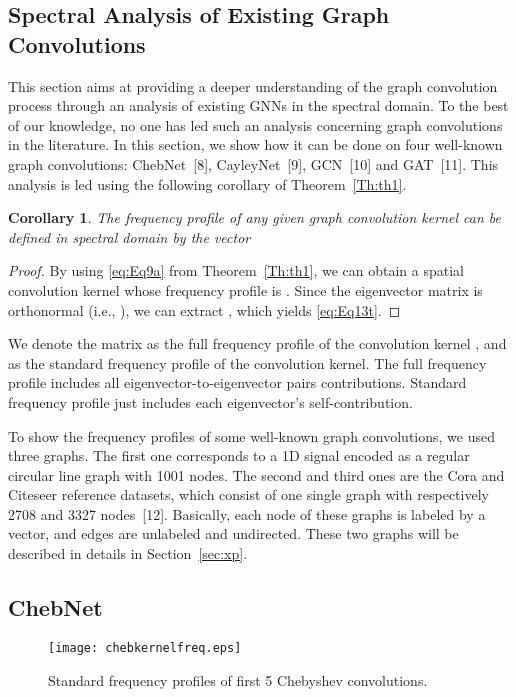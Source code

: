 \documentclass{article}
\newtheorem{corollary}{Corollary}[theorem]
\begin{document}
\subsection{Spectral Analysis of Existing Graph Convolutions}
\label{secSAGC}

This section aims at providing a deeper understanding of the graph convolution process through an analysis of existing GNNs in the spectral domain. 
To the best of our knowledge, no one has led such an analysis concerning graph convolutions in the literature. In this section, we show how it can be done on four well-known graph convolutions: ChebNet~[8], CayleyNet~[9], GCN~[10] and GAT~[11]. This analysis is led using the following corollary of Theorem~\ref{Th:th1}. 

\begin{corollary}
\label{cor:frequency_profile}
The frequency profile of any given graph convolution kernel  can be defined in spectral domain by the vector 
\end{corollary}
\begin{proof}
By using \eqref{eq:Eq9a} from Theorem~\ref{Th:th1}, we can obtain a spatial convolution kernel  whose frequency profile is . Since the eigenvector matrix is orthonormal (i.e., ), we can extract , which yields \eqref{eq:Eq13t}.\end{proof}

We denote the matrix  as the full frequency profile of the convolution kernel , and  as the standard frequency profile of the convolution kernel. The full frequency profile includes all eigenvector-to-eigenvector pairs contributions. Standard frequency profile just includes each eigenvector's self-contribution. 

To show the frequency profiles of some well-known graph convolutions, we used three graphs. The first one corresponds to a 1D signal encoded as a regular circular line graph with 1001 nodes. The second and third ones are the Cora and Citeseer reference datasets, which consist of one single graph with respectively 2708 and 3327 nodes~[12]. Basically, each node of these graphs is labeled by a vector, and edges are unlabeled and undirected. These two graphs will be described in details in Section~\ref{sec:xp}.

\subsection*{ChebNet}

\begin{figure}
\centering
\texttt{[image: chebkernelfreq.eps]}
\medskip
\caption{Standard frequency profiles of first 5 Chebyshev convolutions.
}
\label{fig:chebfreq}
\bigskip
\end{figure}
\end{document}
